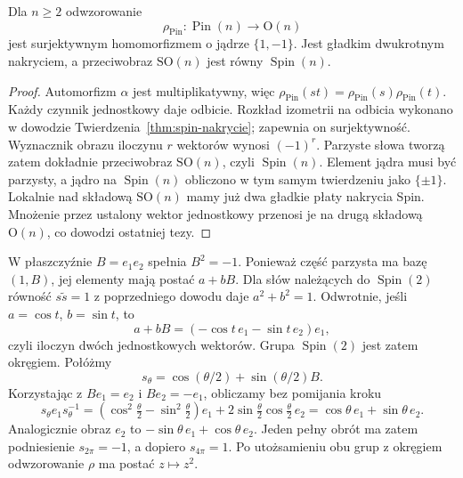 \begin{wniosek}
\label{cor:pin-nakrycie}
Dla $n\geq2$ odwzorowanie
\[
 \rho_{\mathrm{Pin}}:\operatorname{Pin}(n)\longrightarrow
 \mathrm O(n)
\]
jest surjektywnym homomorfizmem o jądrze $\{1,-1\}$.
Jest gładkim dwukrotnym nakryciem, a przeciwobraz
$\mathrm{SO}(n)$ jest równy $\operatorname{Spin}(n)$.
\end{wniosek}
\begin{proof}
Automorfizm $\alpha$ jest multiplikatywny, więc
$\rho_{\mathrm{Pin}}(st)=\rho_{\mathrm{Pin}}(s)
\rho_{\mathrm{Pin}}(t)$. Każdy czynnik jednostkowy
daje odbicie. Rozkład izometrii na odbicia wykonano
w dowodzie Twierdzenia~\ref{thm:spin-nakrycie}; zapewnia
on surjektywność. Wyznacznik obrazu iloczynu $r$
wektorów wynosi $(-1)^r$. Parzyste słowa tworzą
zatem dokładnie przeciwobraz $\mathrm{SO}(n)$, czyli
$\operatorname{Spin}(n)$. Element jądra musi być parzysty,
a jądro na $\operatorname{Spin}(n)$ obliczono w tym samym
twierdzeniu jako $\{\pm1\}$. Lokalnie nad składową
$\mathrm{SO}(n)$ mamy już dwa gładkie płaty nakrycia Spin.
Mnożenie przez ustalony wektor jednostkowy przenosi je
na drugą składową $\mathrm O(n)$, co dowodzi ostatniej tezy.
\end{proof}

\begin{przyklad}
\label{prz:spin2}
W płaszczyźnie $B=e_1e_2$ spełnia $B^2=-1$.
Ponieważ część parzysta ma bazę $(1,B)$,
jej elementy mają postać $a+bB$. Dla słów
należących do $\operatorname{Spin}(2)$ równość
$s\widetilde s=1$ z poprzedniego dowodu daje
$a^2+b^2=1$. Odwrotnie, jeśli
$a=\cos t$, $b=\sin t$, to
\[
 a+bB=(-\cos t\,e_1-\sin t\,e_2)e_1,
\]
czyli iloczyn dwóch jednostkowych wektorów.
Grupa $\operatorname{Spin}(2)$ jest zatem okręgiem.
Połóżmy
\[
 s_\theta=\cos(\theta/2)+\sin(\theta/2)B.
\]
Korzystając z $Be_1=e_2$ i $Be_2=-e_1$,
obliczamy bez pomijania kroku
\[
 s_\theta e_1s_\theta^{-1}
 =(\cos^2\tfrac\theta2-\sin^2\tfrac\theta2)e_1
   +2\sin\tfrac\theta2\cos\tfrac\theta2\,e_2
 =\cos\theta\,e_1+\sin\theta\,e_2.
\]
Analogicznie obraz $e_2$ to
$-\sin\theta\,e_1+\cos\theta\,e_2$.
Jeden pełny obrót ma zatem podniesienie
$s_{2\pi}=-1$, a dopiero $s_{4\pi}=1$.
Po utożsamieniu obu grup z okręgiem odwzorowanie
$\rho$ ma postać $z\mapsto z^2$.
\end{przyklad}

